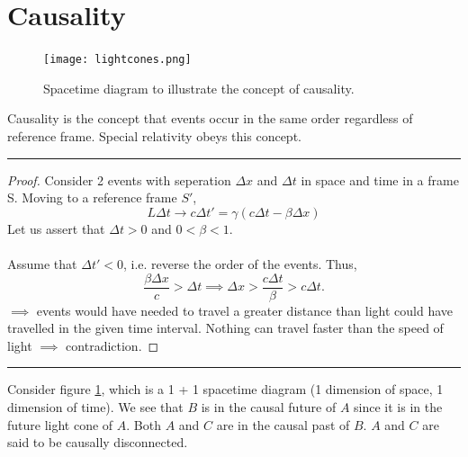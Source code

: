 \documentclass{book}
\begin{document}
\section{Causality}
\begin{figure}
	\centering
	\texttt{[image: lightcones.png]}
	\caption{Spacetime diagram to illustrate the concept of causality.}
	\label{lightcones}
\end{figure}
Causality is the concept that events occur in the same order regardless of reference frame. Special relativity obeys this concept.
\par\noindent\rule{\textwidth}{0.4pt}
\begin{proof}
	Consider 2 events with seperation $\Delta x$ and $\Delta t$ in space and time in a frame S. Moving to a reference frame $S'$,
	\begin{equation}
		L\Delta t \to c\Delta t' = \gamma \left(c\Delta t - \beta \Delta x\right)
	\end{equation}
	Let us assert that $\Delta t > 0$ and $0 < \beta < 1$.
	\\\\
	Assume that $\Delta t' < 0$, i.e. reverse the order of the events. Thus,
	\begin{equation}
		\frac{\beta \Delta x}{c} > \Delta t \implies \Delta x > \frac{c \Delta t}{\beta} > c\Delta t.
	\end{equation}
	$\implies$ events would have needed to travel a greater distance than light could have travelled in the given time interval. Nothing can travel faster than the speed of light $\implies$ contradiction.
\end{proof}
\noindent\rule{\textwidth}{0.4pt}\vspace{10pt}
\noindent
Consider figure \ref{lightcones}, which is a 1 + 1 spacetime diagram (1 dimension of space, 1 dimension of time). We see that $B$ is in the causal future of $A$ since it is in the future light cone of $A$. Both $A$ and $C$ are in the causal past of $B$. $A$ and $C$ are said to be causally disconnected.
\end{document}
